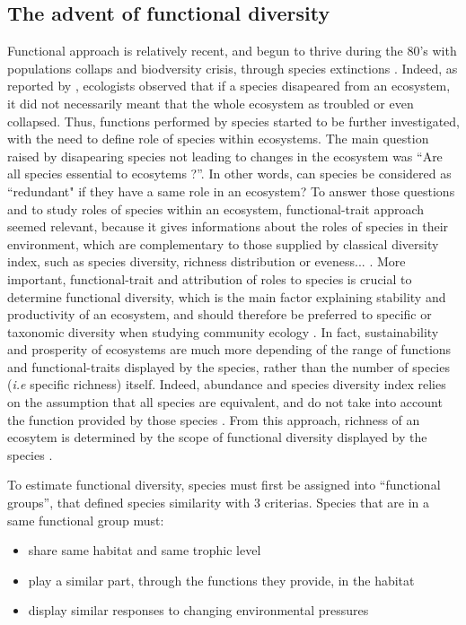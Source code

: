 \subsection{The advent of functional diversity}
Functional approach is relatively recent, and begun to thrive during the 80's with populations collaps and biodversity crisis, through species extinctions \citep{wilson1988}. Indeed, as reported by \citep{mejri2009}, ecologists observed that if a species disapeared from an ecosystem, it did not necessarily meant that the whole ecosystem as troubled or even collapsed. Thus, functions performed by species started to be further investigated, with the need to define role of species within ecosystems. The main question raised by disapearing species not leading to changes in the ecosystem was ``Are all species essential to ecosytems ?''. In other words, can species be considered as ``redundant" if they have a same role in an ecosystem? To answer those questions and to study roles of species within an ecosystem, functional-trait approach seemed relevant, because it gives informations about the roles of species in their environment, which are complementary to those supplied by classical diversity index, such as species diversity, richness distribution or eveness... \citep{marcon2015,mejri2009}. More important, functional-trait and attribution of roles to species is crucial to determine functional diversity, which is the main factor explaining stability and productivity of an ecosystem, and should therefore be preferred to specific or taxonomic diversity when studying community ecology \citep{dumay2004,mejri2009}. In fact, sustainability and prosperity of ecosystems are much more depending of the range of functions and functional-traits displayed by the species, rather than the number of species (\textit{i.e} specific richness) itself. Indeed, abundance and species diversity index relies on the assumption that all species are equivalent, and do not take into account the function provided by those species \citep{mejri2009}. From this approach, richness of an ecosytem is determined by the scope of functional diversity displayed by the species \citep{rocklin2004}. 

To estimate functional diversity, species must first be assigned into ``functional groups'', that defined species similarity with 3 criterias. Species that are in a same functional group must: 
\begin{itemize}
\item share same habitat and same trophic level \citep{brindamour2016}
\item play a similar part, through the functions they provide, in the habitat \citep{dumay2004,mejri2009}
\item display similar responses to changing environmental pressures \citep{dumay2004,brindamour2016,mejri2009}
\end{itemize}

